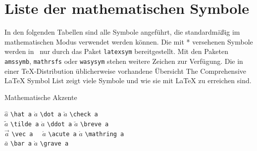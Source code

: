 
\section{Liste der mathematischen Symbole}  \label{symbols}

In den folgenden Tabellen sind alle Symbole angeführt, die
standardmäßig im mathematischen Modus verwendet werden
können.  Die mit * versehenen Symbole werden
in \LaTeXe\ nur durch das Paket \texttt{latexsym} bereitgestellt. 
Mit den Paketen \texttt{amssymb}, 
\texttt{mathrsfs} oder \texttt{wasysym} stehen weitere Zeichen zur 
Verfügung. Die in einer \TeX-Distribution üblicherweise vorhandene Übersicht { The Comprehensive \LaTeX{} Symbol List}\cite{symbols} zeigt viele Symbole und wie sie mit \LaTeX{} zu erreichen sind.


\begin{table}[hbp]
\caption{Mathematische Akzente}  \label{mathakz}
\begin{symbols}
$\hat a$    \> \lstinline|\hat a|   \> $\dot a$   \> \lstinline|\dot a|   \> $\check a$    \> \lstinline|\check a|    \\ 
$\tilde a$  \> \lstinline|\tilde a| \> $\ddot a$  \> \lstinline|\ddot a|  \> $\breve a$    \> \lstinline|\breve a|    \\
$\vec a$    \> \lstinline|\vec a  | \> $\acute a$ \> \lstinline|\acute a| \> $\mathring a$ \> \lstinline|\mathring a| \\
$\bar a$    \> \lstinline|\bar a|   \> $\grave a$ \> \lstinline|\grave a| \\
\end{symbols}
\end{table}

